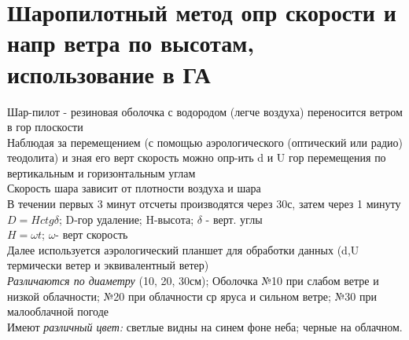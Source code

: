
\section{Шаропилотный метод опр скорости и напр ветра по высотам, использование в ГА}
Шар-пилот - резиновая оболочка с водородом (легче воздуха) переносится ветром в гор плоскости\\
Наблюдая за перемещением (с помощью аэрологического (оптический или радио) теодолита) и зная его верт скорость можно опр-ить d и U гор перемещения по вертикальным и горизонтальным углам\\
Скорость шара зависит от плотности воздуха и шара\\
В течении первых 3 минут отсчеты производятся через 30с, затем через 1 минуту\\
$D=Hctg\delta$; D-гор удаление; H-высота; $\delta$ - верт. углы\\
$H=\omega t$; $\omega$- верт скорость\\
Далее используется аэрологический планшет для обработки данных (d,U термически ветер и эквивалентный ветер)\\

\textit{Различаются по диаметру} (10, 20, 30см); Оболочка №10 при слабом ветре и низкой облачности; №20 при облачности ср яруса и сильном ветре; №30 при малооблачной погоде\\
Имеют \textit{различный цвет:} светлые видны на синем фоне неба; черные на облачном.

